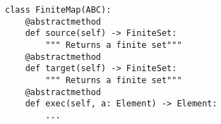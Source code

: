 \begin{verbatim}
class FiniteMap(ABC):
    @abstractmethod
    def source(self) -> FiniteSet:
        """ Returns a finite set"""
    @abstractmethod
    def target(self) -> FiniteSet:
        """ Returns a finite set"""
    @abstractmethod
    def exec(self, a: Element) -> Element:
        ...
\end{verbatim}
